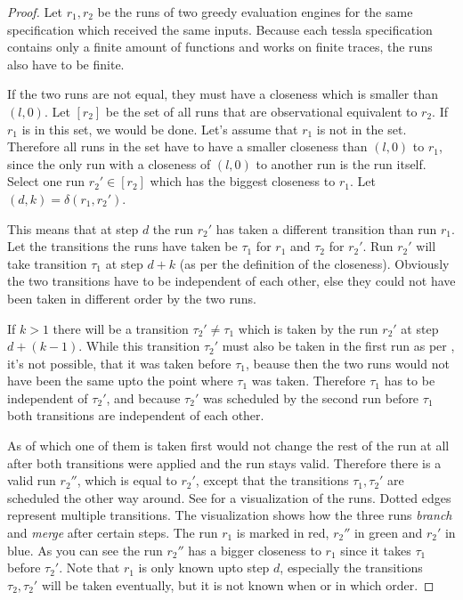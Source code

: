\begin{proof}\label{proof:equiv_greedy_engines}
  Let \(r_1, r_2\) be the runs of two greedy evaluation engines for the same specification which received the same inputs.
  Because each \gls{tessla} specification contains only a finite amount of functions and works on finite traces, the runs also have to be finite.

  If the two runs are not equal, they must have a closeness which is smaller than \((l, 0)\).
  Let \([r_2]\) be the set of all runs that are observational equivalent to \(r_2\).
  If \(r_1\) is in this set, we would be done.
  Let's assume that \(r_1\) is not in the set.
  Therefore all runs in the set have to have a smaller closeness than \((l,0)\) to \(r_1\), since the only run with a closeness of \((l,0)\) to another run is the run itself.
  Select one run \(r_2' \in [r_2]\) which has the biggest closeness to \(r_1\).
  Let \((d,k) = \delta(r_1, r_2')\).

  This means that at step \(d\) the run \(r_2'\) has taken a different transition than run \(r_1\).
  Let the transitions the runs have taken be \(\tau_1\) for \(r_1\) and \(\tau_2\) for \(r_2'\).
  Run \(r_2'\) will take transition \(\tau_1\) at step \(d+k\) (as per the definition of the closeness).
  Obviously the two transitions have to be independent of each other, else they could not have been taken in different order by the two runs.

  If \(k > 1\) there will be a transition \(\tau_2' \neq \tau_1\) which is taken by the run \(r_2'\) at step \(d+(k-1)\).
  While this transition \(\tau_2'\) must also be taken in the first run as per , it's not possible, that it was taken before \(\tau_1\), beause then the two runs would not have been the same upto the point where \(\tau_1\) was taken.
  Therefore \(\tau_1\) has to be independent of \(\tau_2'\), and because \(\tau_2'\) was scheduled by the second run before \(\tau_1\) both transitions are independent of each other.

  As of  which one of them is taken first would not change the rest of the run at all after both transitions were applied and the run stays valid.
  Therefore there is a valid run \(r_2''\), which is equal to \(r_2'\), except that the transitions \(\tau_1, \tau_2'\) are scheduled the other way around.
  See  for a visualization of the runs.
  Dotted edges represent multiple transitions. The visualization shows how the three runs \emph{branch} and \emph{merge} after certain steps.
  The run \(r_1\) is marked in red, \(r_2''\) in green and \(r_2'\) in blue.
  As you can see the run \(r_2''\) has a bigger closeness to \(r_1\) since it takes \(\tau_1\) before \(\tau_2'\).
  Note that \(r_1\) is only known upto step \(d\), especially the transitions \(\tau_2, \tau_2'\) will be taken eventually, but it is not known when or in which order.


\end{proof}
